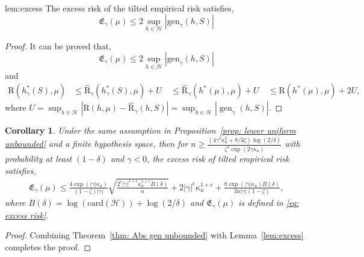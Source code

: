 \documentclass{article}
\theoremstyle{plain}
\theoremstyle{plain}
\newtheorem{corollary}[theorem]{Corollary}
\theoremstyle{definition}
\theoremstyle{remark}
\begin{document}
\begin{replemma}{lem:excess}
    The excess risk of the tilted empirical risk satisfies,
    \[ \mathfrak{E}_{\gamma}(\mu)\leq 2\sup_{h\in\mathcal{H}}| \mathrm{gen}_{\gamma}(h,S)|\]
\end{replemma}
\begin{proof}
        It can be proved that, 
    \[ \mathfrak{E}_{\gamma}(\mu)\leq 2\sup_{h\in\mathcal{H}}| \mathrm{gen}_{\gamma}(h,S)|\]
and
 $$\begin{aligned} \mathrm{R}(h_\gamma^* (S),\mu) &\leq \hat{\mathrm{R}}_\gamma(h_\gamma^*(S),\mu)+U\ &\leq \hat{\mathrm{R}}_\gamma(h^*(\mu),\mu)+U\ &\leq \mathrm{R}(h^*(\mu),\mu)+2U, \end{aligned}$$ where $U=\sup_{h\in\mathcal{H}}|\mathrm{R}(h,\mu)-\hat{\mathrm{R}}_{\gamma}(h,S)|=\sup_{h\in\mathcal{H}}|\operatorname{gen}_{\gamma}(h,S)|.$
\end{proof}
\begin{tcolorbox}
\begin{corollary}\label{Cor: excess unbounded}
 Under the same assumption in Proposition~\ref{prop: lower uniform unbounded} and a finite hypothesis space, then for $n\geq \frac{(4\gamma^2\kappa_u^2+8/3 \zeta )\log(2/\delta)}{\zeta^2\exp(2\gamma \kappa_u)}$ with probability at least $(1-\delta)$ and $\gamma<0$, the excess risk of tilted empirical risk satisfies, 
    \begin{align}
        \mathfrak{E}_\gamma(\mu)\leq \frac{4\exp(|\gamma| \kappa_u)}{(1-\zeta)|\gamma|}\sqrt{\frac{2^{\epsilon}|\gamma|^{1+\epsilon}\kappa_u^{1+\epsilon}B(\delta)}{n}} +2|\gamma|^{\epsilon}\kappa_u^{1+\epsilon} 
         +\frac{8\exp(|\gamma| \kappa_u)B(\delta)}{3n|\gamma|(1-\zeta)},
             \end{align}
             where $B(\delta)= \log(\mathrm{card}(\mathcal{H}))+\log(2/\delta)$ and $\mathfrak{E}_\gamma(\mu)$ is defined in \eqref{eq: excess risk}.
\end{corollary}
\end{tcolorbox}
\begin{proof}
Combining Theorem~\ref{thm: Abs gen unbounded} with Lemma~\ref{lem:excess} completes the proof.
 \end{proof}
\end{document}
